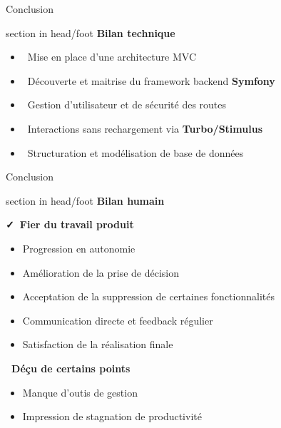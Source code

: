 \documentclass{beamer}
\begin{document}
\begin{frame}{Conclusion}
  	\begin{beamercolorbox}[wd=\paperwidth,ht=1.5em,dp=0.5em,leftskip=0.5cm]{section in head/foot}
  		\large \textbf{Bilan technique}
	\end{beamercolorbox}
	\vspace{0.5em}
	\begin{center}
  		\begin{minipage}{0.9\textwidth}
  			\begin{itemize}
  				\item \faLaptopCode\ Mise en place d'une architecture MVC
  				\item \faCodeBranch\ Découverte et maitrise du framework backend \textbf{Symfony}
  				\item \faLock\ Gestion d'utilisateur et de sécurité des routes
  				\item \faBolt\ Interactions sans rechargement via \textbf{Turbo/Stimulus}
  				\item \faDatabase\ Structuration et modélisation de base de données
			\end{itemize}
  		\end{minipage}
	\end{center}
	\vfill
\end{frame}

\begin{frame}{Conclusion}
  	\begin{beamercolorbox}[wd=\paperwidth,ht=1.5em,dp=0.5em,leftskip=0.5cm]{section in head/foot}
  		\large \textbf{Bilan humain}
	\end{beamercolorbox}
	\vspace{0.5em}
	\begin{center}
  		\begin{minipage}{1\textwidth}
  			\textbf{\faCheck\ Fier du travail produit}
  			\begin{itemize}
  				\item Progression en autonomie
  				\item Amélioration de la prise de décision
  				\item Acceptation de la suppression de certaines fonctionnalités
  				\item Communication directe et feedback régulier
  				\item Satisfaction de la réalisation finale
  			\end{itemize}
  				
  			\pause

  			\textbf{\faTimes\ Déçu de certains points}
  			\begin{itemize}
  				\item Manque d'outis de gestion
		  		\item Impression de stagnation de productivité
  			\end{itemize}
  		\end{minipage}
	\end{center}
	\vfill
\end{frame}
\end{document}
